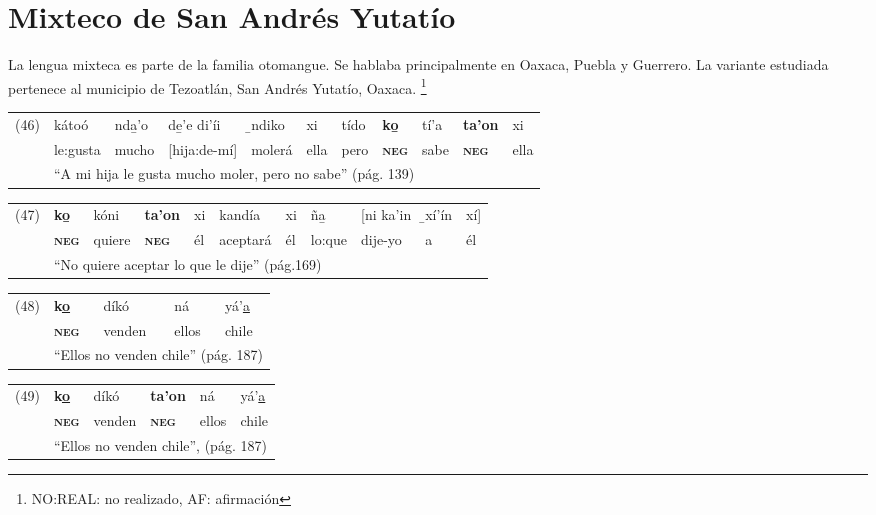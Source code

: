 \section*{Mixteco de San Andrés Yutatío}

\noindent La lengua mixteca es parte de la familia otomangue. Se hablaba principalmente en Oaxaca, Puebla y Guerrero. La variante estudiada pertenece al municipio de Tezoatlán, San Andrés Yutatío, Oaxaca.
\footnote{NO:REAL: no realizado, AF: afirmación}
\vspace{0.2cm}

{\setmainfont{Charis SIL} 

{\small
\noindent \begin{tabular}{lllllllllll}
(46) & kátoó & nda̱'o & de̱'e di'íi & ̱ndiko & xi & tído & \textbf{ko̱} & tí'a & \textbf{ta'on} & xi \\
& le:gusta & mucho & [hija:de-mí] & molerá & ella & pero & \textsc{\textbf{neg}} & sabe & \textsc{\textbf{neg}} & ella \\
& \multicolumn{10}{l}{``A mi hija le gusta mucho moler, pero no sabe'' (pág. 139)}
\end{tabular} \vspace{0.2cm}}

\noindent \begin{tabular}{lllllllllll}
(47) & \textbf{ko̱} & kóni & \textbf{ta'on} & xi & kandía & xi & ña̱ & [ni ka'in & ̱xí'ín & xí] \\
& \textsc{\textbf{neg}} & quiere & \textsc{\textbf{neg}} & él & aceptará & él & lo:que & dije-yo & a & él \\
& \multicolumn{10}{l}{``No quiere aceptar lo que le dije'' (pág.169)}
\end{tabular} \vspace{0.2cm}

\noindent \begin{tabular}{lllll}
(48) & \textbf{k\underline{o}} & díkó & ná & yá'\underline{a} \\
& \textsc{\textbf{neg}} & venden & ellos & chile \\
& \multicolumn{4}{l}{``Ellos no venden chile'' (pág. 187)}
\end{tabular} \vspace{0.2cm}

\noindent \begin{tabular}{llllll}
(49) &  \textbf{k\underline{o}} & díkó & \textbf{ta'on} & ná & yá'\underline{a} \\
& \textsc{\textbf{neg}} & venden & \textsc{\textbf{neg}} & ellos & chile \\
& \multicolumn{5}{l}{``Ellos no venden chile'', (pág. 187)}
\end{tabular} \vspace{0.2cm}

}
